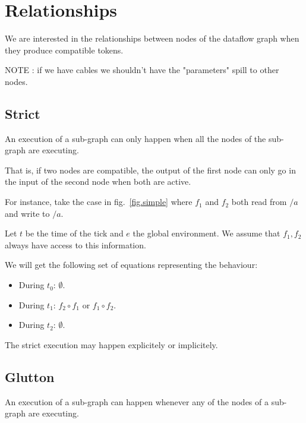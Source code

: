 \documentclass{article}
\begin{document}
	
    
	\section{Relationships}
    We are interested in the relationships between nodes of the dataflow graph when they produce compatible tokens.
     
     NOTE : if we have cables  we shouldn't have the "parameters" spill to other nodes. 
    \subsection{Strict}
    An execution of a sub-graph can only happen when all the nodes of the sub-graph are executing.
    
    That is, if two nodes are compatible, the output of the first node can only go in the input of the second node when both are active.
    
    For instance, take the case in fig.~\ref{fig.simple} where $f_1$ and $f_2$ both read from $/a$ and write to $/a$.
    
    Let $t$ be the time of the tick and $e$ the global environment. We assume that $f_1, f_2$ always have access to this information.
    
    We will get the following set of equations representing the behaviour: 
    \begin{itemize}
        \item During $t_0$: $\emptyset$.
        \item During $t_1$: $f_2 \circ f_1 $ or $f_1 \circ f_2$.
        \item During $t_2$: $\emptyset$. 
    \end{itemize}

    The strict execution may happen explicitely or implicitely.
    
	\subsection{Glutton}
	An execution of a sub-graph can happen whenever any of the nodes of a sub-graph are executing. 
    
\end{document}

